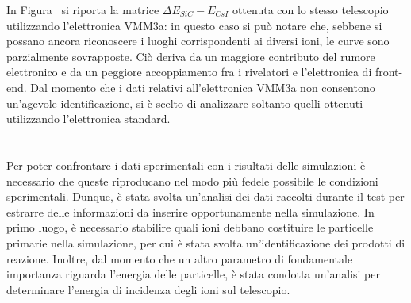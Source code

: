 


In Figura~ si riporta la  matrice $\Delta E_{SiC} - E_{CsI}$ ottenuta con lo stesso telescopio utilizzando l'elettronica VMM3a: in questo caso si può notare che, sebbene si possano ancora riconoscere i luoghi corrispondenti ai diversi ioni, le curve sono parzialmente sovrapposte.
Ciò deriva da un maggiore contributo del rumore elettronico e da un peggiore accoppiamento fra i rivelatori e l'elettronica di front-end.
Dal momento che i dati relativi all'elettronica VMM3a non consentono un'agevole identificazione, si è scelto di analizzare soltanto quelli ottenuti utilizzando l'elettronica standard.



\section{}

Per poter confrontare i dati sperimentali con i risultati delle simulazioni è necessario che queste riproducano nel modo più fedele possibile le condizioni sperimentali.
Dunque, è stata svolta un'analisi dei dati raccolti durante il test per estrarre delle informazioni da inserire opportunamente nella simulazione.
In primo luogo, è necessario stabilire quali ioni debbano costituire le particelle primarie nella simulazione, per cui è stata svolta un'identificazione dei prodotti di reazione.
Inoltre, dal momento che un altro parametro di fondamentale importanza riguarda l'energia delle particelle, è stata condotta un'analisi per determinare l'energia di incidenza degli ioni sul telescopio.


